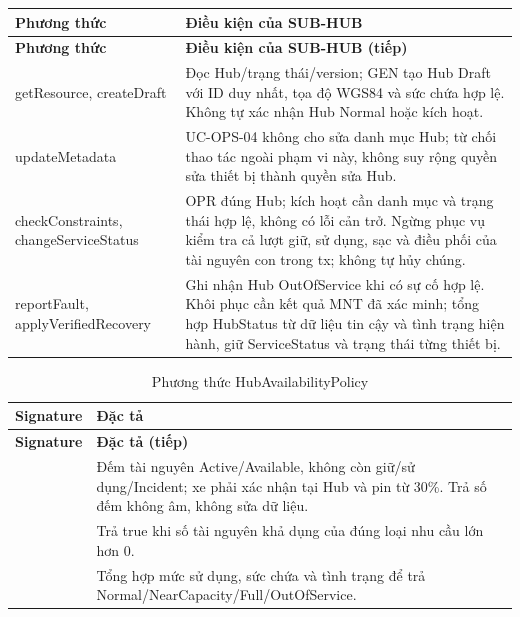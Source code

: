 \begingroup
\renewcommand{\theHtable}{owner.hub}
\begin{longtable}{|L{58mm}|L{81mm}|}
\hline
\textbf{Phương thức} & \textbf{Điều kiện của SUB-HUB}\\\hline
\endfirsthead
\hline\textbf{Phương thức} & \textbf{Điều kiện của SUB-HUB (tiếp)}\\\hline\endhead
getResource, createDraft & Đọc Hub/trạng thái/version; GEN tạo Hub Draft với ID duy nhất, tọa độ WGS84 và sức chứa hợp lệ. Không tự xác nhận Hub Normal hoặc kích hoạt.\\\hline
updateMetadata & UC-OPS-04 không cho sửa danh mục Hub; từ chối thao tác ngoài phạm vi này, không suy rộng quyền sửa thiết bị thành quyền sửa Hub.\\\hline
checkConstraints, changeServiceStatus & OPR đúng Hub; kích hoạt cần danh mục và trạng thái hợp lệ, không có lỗi cản trở. Ngừng phục vụ kiểm tra cả lượt giữ, sử dụng, sạc và điều phối của tài nguyên con trong tx; không tự hủy chúng.\\\hline
reportFault, applyVerifiedRecovery & Ghi nhận Hub OutOfService khi có sự cố hợp lệ. Khôi phục cần kết quả MNT đã xác minh; tổng hợp HubStatus từ dữ liệu tin cậy và tình trạng hiện hành, giữ ServiceStatus và trạng thái từng thiết bị.\\\hline
\end{longtable}
\addtocounter{table}{-1}
\endgroup

\begin{longtable}{|L{58mm}|L{81mm}|}
\caption{Phương thức HubAvailabilityPolicy}\\\hline
\textbf{Signature} & \textbf{Đặc tả}\\\hline
\endfirsthead
\hline\textbf{Signature} & \textbf{Đặc tả (tiếp)}\\\hline\endhead
{} & Đếm tài nguyên Active/Available, không còn giữ/sử dụng/Incident; xe phải xác nhận tại Hub và pin từ 30\%. Trả số đếm không âm, không sửa dữ liệu.\\\hline
{} & Trả true khi số tài nguyên khả dụng của đúng loại nhu cầu lớn hơn 0.\\\hline
{} & Tổng hợp mức sử dụng, sức chứa và tình trạng để trả Normal/NearCapacity/Full/OutOfService.\\\hline
\end{longtable}

